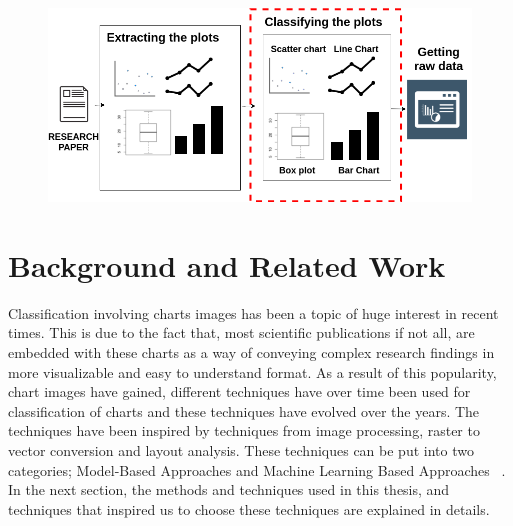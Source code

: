 \documentclass[12pt, a4paper,oneside]{report}
\begin{document}
\begin{figure}[!htb]
\includegraphics [scale=0.48] {vision}
\label{fig:vis}
\end{figure}


\chapter{Background and Related Work}
Classification involving charts images has been a topic of huge interest in recent times. This is due to the fact that, most scientific publications if not all, are embedded with these charts as a way of conveying complex research findings in more visualizable and easy to understand format. As a result of this popularity, chart images have gained, different techniques have over time been used for classification of charts and these techniques have evolved over the years. The techniques have been inspired by techniques from image processing, raster to vector conversion and layout analysis. These techniques can be put into two categories; Model-Based Approaches and Machine Learning Based Approaches ~\cite{amara2017convolutional}. In the next section, the methods and techniques used in this thesis, and techniques that inspired us to choose these techniques are explained in details.
\end{document}
